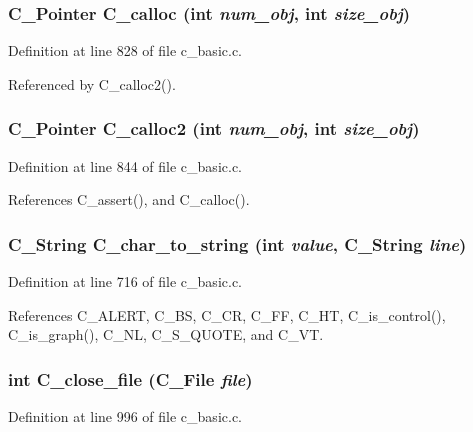 \subsubsection{\setlength{\rightskip}{0pt plus 5cm}\bf{C\_\-Pointer} C\_\-calloc (int {\em num\_\-obj}, int {\em size\_\-obj})}\label{c__basic_8h_fad9011d98ff56b182b52e2f68d67a82}




Definition at line 828 of file c\_\-basic.c.

Referenced by C\_\-calloc2().
\subsubsection{\setlength{\rightskip}{0pt plus 5cm}\bf{C\_\-Pointer} C\_\-calloc2 (int {\em num\_\-obj}, int {\em size\_\-obj})}\label{c__basic_8h_e0afa8cd9a3869c1e1f21acec0736f8d}




Definition at line 844 of file c\_\-basic.c.

References C\_\-assert(), and C\_\-calloc().
\subsubsection{\setlength{\rightskip}{0pt plus 5cm}\bf{C\_\-String} C\_\-char\_\-to\_\-string (int {\em value}, \bf{C\_\-String} {\em line})}\label{c__basic_8h_4a4051a87546f31b2c503a6993cb04c4}




Definition at line 716 of file c\_\-basic.c.

References C\_\-ALERT, C\_\-BS, C\_\-CR, C\_\-FF, C\_\-HT, C\_\-is\_\-control(), C\_\-is\_\-graph(), C\_\-NL, C\_\-S\_\-QUOTE, and C\_\-VT.
\subsubsection{\setlength{\rightskip}{0pt plus 5cm}int C\_\-close\_\-file (\bf{C\_\-File} {\em file})}\label{c__basic_8h_f4d38ec731805345c3c69f7e8f8c11a9}




Definition at line 996 of file c\_\-basic.c.

